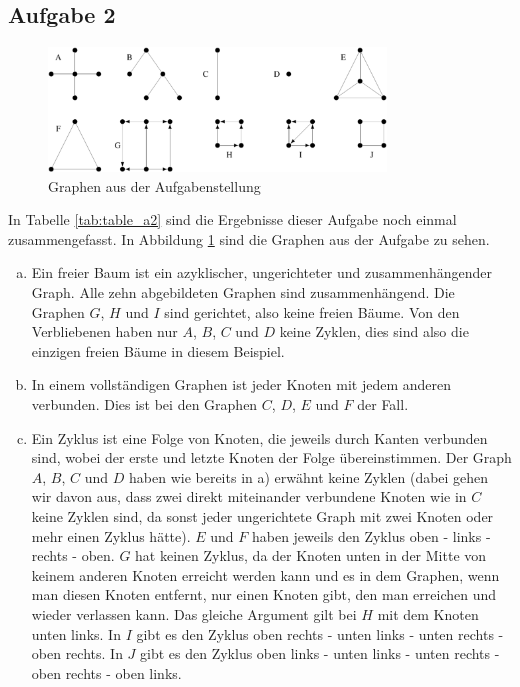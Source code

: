 \documentclass[11pt]{article}
\begin{document}
\subsection*{Aufgabe 2}
\begin{figure}[h!]
  \centering
  \includegraphics[width=0.8\textwidth]{a2_graphs.png}
  \caption{Graphen aus der Aufgabenstellung}
  \label{fig:a2_graphs}
\end{figure}
In Tabelle \ref{tab:table_a2} sind die Ergebnisse dieser Aufgabe noch einmal
zusammengefasst. In Abbildung \ref{fig:a2_graphs} sind die Graphen aus der Aufgabe zu
sehen.
\begin{enumerate}[a)]
  \item
    Ein freier Baum ist ein azyklischer, ungerichteter und zusammenhängender
    Graph. Alle zehn abgebildeten Graphen sind zusammenhängend. Die Graphen $G$,
    $H$ und $I$ sind gerichtet, also keine freien Bäume. Von den Verbliebenen
    haben nur $A$, $B$, $C$ und $D$ keine Zyklen, dies sind also die einzigen
    freien Bäume in diesem Beispiel.
  \item
    In einem vollständigen Graphen ist jeder Knoten mit jedem anderen verbunden.
    Dies ist bei den Graphen $C$, $D$, $E$ und $F$ der Fall.
  \item
    Ein Zyklus ist eine Folge von Knoten, die jeweils durch Kanten verbunden
    sind, wobei der erste und letzte Knoten der Folge übereinstimmen. Der Graph
    $A$, $B$, $C$ und $D$ haben wie bereits in a) erwähnt keine Zyklen (dabei
    gehen wir davon aus, dass zwei direkt miteinander verbundene Knoten wie in
    $C$ keine Zyklen sind, da sonst jeder ungerichtete Graph mit zwei Knoten
    oder mehr einen Zyklus hätte). $E$ und $F$ haben jeweils den Zyklus
    \textsf{oben - links - rechts - oben}. $G$ hat keinen Zyklus, da der Knoten
    unten in der Mitte von keinem anderen Knoten erreicht werden kann und es in
    dem Graphen, wenn man diesen Knoten entfernt, nur einen Knoten gibt, den man
    erreichen und wieder verlassen kann. Das gleiche Argument gilt bei $H$ mit
    dem Knoten unten links. In $I$ gibt es den Zyklus
    \textsf{oben rechts - unten links - unten rechts - oben rechts}. In $J$ gibt
    es den Zyklus
    \textsf{oben links - unten links - unten rechts - oben rechts - oben links}.
\end{enumerate}
\end{document}
